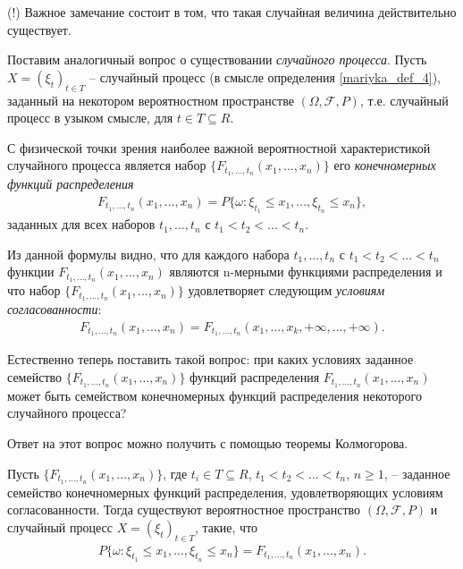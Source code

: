 \begin{enumerate}
(!) Важное замечание состоит в том, что такая случайная величина действительно существует. 

Поставим аналогичный вопрос о существовании \textit{случайного процесса}. Пусть $X = (\xi_t)_{t \in T}$ -- случайный процесс (в смысле определения \ref{mariyka_def_4}), заданный на некотором вероятностном пространстве $(\Omega, \mathcal{F}, P)$, т.е. случайный процесс в узыком смысле, для $t \in T \subseteq R$. 

С физической точки зрения наиболее важной вероятностной характеристикой случайного процесса является набор $\{F_{t_1, ... , t_n} (x_1 , ..., x_n)\}$ его \textit{конечномерных функций распределения}
\begin{align*}
F_{t_1, ... , t_n} (x_1 , ..., x_n) = P\{\omega: \xi_{t_1} \leq x_1, ... ,\xi_{t_n} \leq x_n \},
\end{align*}
заданных для всех наборов $t_1, ..., t_n$ с $t_1 < t_2 < ... < t_n$.

Из данной формулы видно, что для каждого набора $t_1, ..., t_n$ с $t_1 < t_2 < ... < t_n$ функции $F_{t_1, ... , t_n} (x_1 , ..., x_n)$ являются n-мерными функциями распределения и что набор $\{ F_{t_1, ... , t_n} (x_1 , ..., x_n) \}$ удовлетворяет следующим \textit{условиям согласованности}:
\begin{align*}
F_{t_1, ... , t_n} (x_1 , ..., x_n) = F_{t_1, ... , t_n} (x_1 , ..., x_k, +\infty, ... , + \infty).
\end{align*}

Естественно теперь поставить такой вопрос: при каких условиях заданное семейство $\{ F_{t_1, ... , t_n} (x_1 , ..., x_n) \}$ функций распределения $F_{t_1, ... , t_n} (x_1 , ..., x_n)$ может быть семейством конечномерных функций распределения некоторого случайного процесса? 

Ответ на этот вопрос можно получить с помощью теоремы Колмогорова.


\begin{theorem}
Пусть $\{ F_{t_1, ... , t_n} (x_1 , ..., x_n) \}$, где $t_i \in T \subseteq R$, $t_1 < t_2 < ... < t_n$, $n\geq1$, -- заданное семейство конечномерных функций распределения, удовлетворяющих условиям согласованности. Тогда существуют вероятностное пространство $(\Omega, \mathcal{F}, P)$ и случайный процесс $X = (\xi_t)_{t \in T}$, такие, что
\begin{align*}
P\{\omega: \xi_{t_1} \leq x_1, ... ,\xi_{t_n} \leq x_n \} =  F_{t_1, ... , t_n} (x_1 , ..., x_n). 
\end{align*}
\end{theorem}


\end{enumerate}
